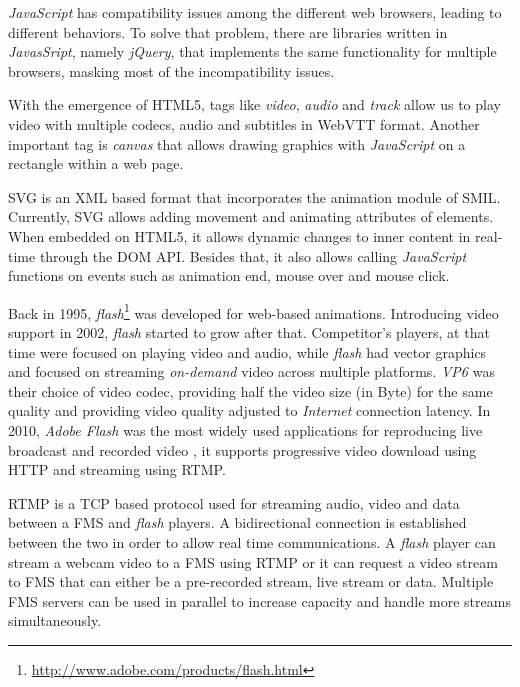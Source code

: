   \emph{JavaScript} has compatibility issues among the different web browsers, leading to different behaviors. To solve that problem, there are libraries written in \emph{JavasSript}, namely \emph{jQuery}, that implements the same functionality for multiple browsers, masking most of the incompatibility issues.

  With the emergence of \ac{HTML}5, tags like \emph{video}, \emph{audio} and \emph{track} allow us to play video with multiple codecs, audio and subtitles in \ac{WebVTT} format. Another important tag is \emph{canvas} that allows drawing graphics with \emph{JavaScript} on a rectangle within a web page.

  
  \ac{SVG} is an \ac{XML} based format that incorporates the animation module of \ac{SMIL}. Currently, \ac{SVG} allows adding movement and animating attributes of elements. When embedded on \ac{HTML}5, it allows dynamic changes to inner content in real-time through the \ac{DOM} \ac{API}. Besides that, it also allows calling \emph{JavaScript} functions on events such as animation end, mouse over and mouse click.
  
  Back in 1995, \emph{flash}\footnote{\url{http://www.adobe.com/products/flash.html}} was developed for web-based animations. Introducing video support in 2002, \emph{flash} started to grow after that. Competitor's players, at that time were focused on playing video and audio, while \emph{flash} had vector graphics and focused on streaming \emph{on-demand} video across multiple platforms. \emph{VP6} was their choice of video codec, providing half the video size (in Byte) for the same quality and providing video quality adjusted to \emph{Internet} connection latency. 
  In 2010, \emph{Adobe Flash} was the most widely used applications for reproducing live broadcast and recorded video \cite{flashvideo}, it supports progressive video download using \ac{HTTP} and streaming using \ac{RTMP}.

  \ac{RTMP} is a \ac{TCP} based protocol used for streaming audio, video and data between a \ac{FMS} and \emph{flash} players. A bidirectional connection is established between the two in order to allow real time communications. A \emph{flash} player can stream a webcam video to a \ac{FMS} using \ac{RTMP} or it can request a video stream to \ac{FMS} that can either be a pre-recorded stream, live stream or data. Multiple \ac{FMS} servers can be used in parallel to increase capacity and handle more streams simultaneously.

